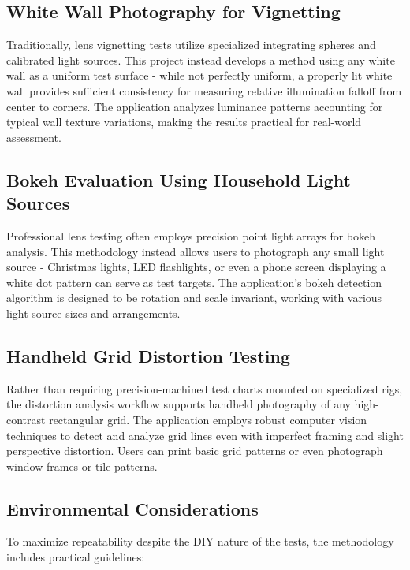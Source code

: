 \subsection{White Wall Photography for Vignetting}
Traditionally, lens vignetting tests utilize specialized integrating spheres and calibrated light sources. This project instead develops a method using any white wall as a uniform test surface - while not perfectly uniform, a properly lit white wall provides sufficient consistency for measuring relative illumination falloff from center to corners. The application analyzes luminance patterns accounting for typical wall texture variations, making the results practical for real-world assessment.

\subsection{Bokeh Evaluation Using Household Light Sources} 
Professional lens testing often employs precision point light arrays for bokeh analysis. This methodology instead allows users to photograph any small light source - Christmas lights, LED flashlights, or even a phone screen displaying a white dot pattern can serve as test targets. The application's bokeh detection algorithm is designed to be rotation and scale invariant, working with various light source sizes and arrangements.

\subsection{Handheld Grid Distortion Testing}
Rather than requiring precision-machined test charts mounted on specialized rigs, the distortion analysis workflow supports handheld photography of any high-contrast rectangular grid. The application employs robust computer vision techniques to detect and analyze grid lines even with imperfect framing and slight perspective distortion. Users can print basic grid patterns or even photograph window frames or tile patterns.

\subsection{Environmental Considerations}
To maximize repeatability despite the DIY nature of the tests, the methodology includes practical guidelines:

